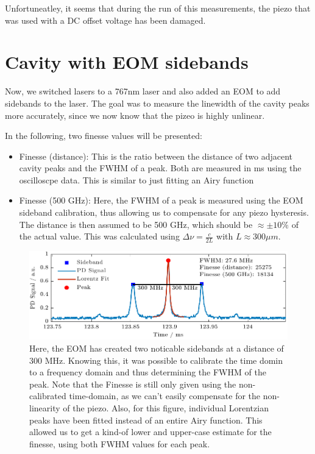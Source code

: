 \documentclass[a4paper,11pt]{article}
\begin{document}
Unfortuneatley, it seems that during the run of this measurements, the piezo that was used with a DC offset voltage has been damaged. 







\newpage
\section{Cavity with EOM sidebands}
Now, we switched lasers to a 767nm laser and also added an EOM to add sidebands to the laser.
The goal was to measure the linewidth of the cavity peaks more accurately, since we now know that the pizeo is highly unlinear.

In the following, two finesse values will be presented: 
\begin{itemize}
    \item Finesse (distance): This is the ratio between the distance of two adjacent cavity peaks and the FWHM of a peak. Both are measured in ms using the oscilloscpe data. This is similar to just fitting an Airy function
    \item Finesse (500 GHz): Here, the FWHM of a peak is measured using the EOM sideband calibration, thus allowing us to compensate for any piezo hysteresis. The distance is then assumed to be 500 GHz, which should be $\approx \pm 10\%$ of the actual value. This was calculated using $\Delta \nu = \frac{c}{2L}$ with $L\approx300 \mu m$.
\end{itemize}


\begin{figure}[H]
    \centering
    \includegraphics[width=\textwidth]{EOM/Peak2.pdf}
    \caption{Here, the EOM has created two noticable sidebands at a distance of 300 MHz. Knowing this, it was possible to calibrate the time domin to a frequency domain and thus determining the FWHM of the peak. Note that the Finesse is still only given using the non-calibrated time-domain, as we can't easily compensate for the non-linearity of the piezo. Also, for this figure, individual Lorentzian peaks have been fitted instead of an entire Airy function. This allowed us to get a kind-of lower and upper-case estimate for the finesse, using both FWHM values for each peak.}
\end{figure}
\end{document}
